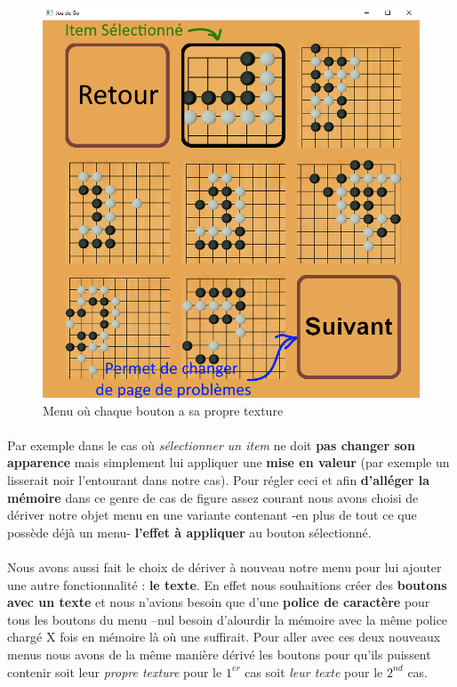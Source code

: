             \begin{figure}[h!]
            \centering
            \includegraphics[scale=0.45]{figures/experiments/Menu_pbs.png}
            \caption{Menu où chaque bouton a sa propre texture}
            \label{fig:menu_prbls}
            \end{figure}
            
            \paragraph{}Par exemple dans le cas où \textit{sélectionner un item} ne doit \textbf{pas changer son apparence} mais simplement lui appliquer une \textbf{mise en valeur} (par exemple un lisserait noir l’entourant dans notre cas). Pour régler ceci et afin \textbf{d’alléger la mémoire} dans ce genre de cas de figure assez courant nous avons choisi de dériver notre objet menu en une variante contenant -en plus de tout ce que possède déjà un menu- \textbf{l’effet à appliquer} au bouton sélectionné. 
             
            \paragraph{}Nous avons aussi fait le choix de dériver à nouveau notre menu pour lui ajouter une autre fonctionnalité : \textbf{le texte}. En effet nous souhaitions créer des \textbf{boutons avec un texte} et nous n’avions besoin que d’une \textbf{police de caractère} pour tous les boutons du menu –nul besoin d’alourdir la mémoire avec la même police chargé X fois en mémoire là où une suffirait.
            Pour aller avec ces deux nouveaux menus nous avons de la même manière dérivé les boutons pour qu’ils puissent contenir soit leur \textit{propre texture} pour le $1^{er}$ cas soit \textit{leur texte} pour le $2^{nd}$ cas.
            
